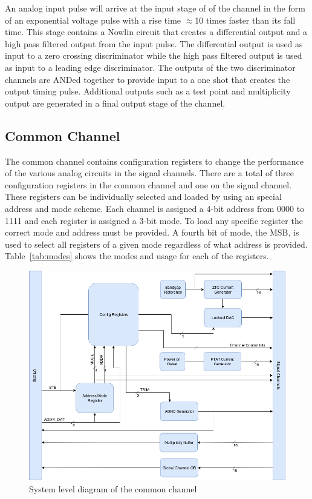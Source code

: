 \documentclass[12pt,oneside,final]{siuethesis}
\theoremstyle{definition}
\begin{document}
\par An analog input pulse will arrive at the input stage of of the channel in the form of an exponential voltage pulse with a rise time $\approx$10 times faster than its fall time. This stage contains a Nowlin circuit that creates a differential output and a high pass filtered output from the input pulse. The differential output is used as input to a zero crossing discriminator while the high pass filtered output is used as input to a leading edge discriminator. The outputs of the two discriminator channels are ANDed together to provide input to a one shot that creates the output timing pulse. Additional outputs such as a test point and multiplicity output are generated in a final output stage of the channel. 

\subsection{Common Channel}
\par The common channel contains configuration registers to change the performance of the various analog circuits in the signal channels. There are a total of three configuration registers in the common channel and one on the signal channel. These registers can be individually selected and loaded by using an special address and mode scheme. Each channel is assigned a 4-bit address from 0000 to 1111 and each register is assigned a 3-bit mode. To load any specific register the correct mode and address must be provided. A fourth bit of mode, the MSB, is used to select all registers of a given mode regardless of what address is provided. Table~\ref{tab:modes} shows the modes and usage for each of the registers.

\begin{figure}[htbp!]
\centering
\includegraphics[scale=.5,keepaspectratio=true]{./ch2_figures/common_block.png} 
\caption{System level diagram of the common channel}
\label{fig:common-block}
\end{figure}
\end{document}
